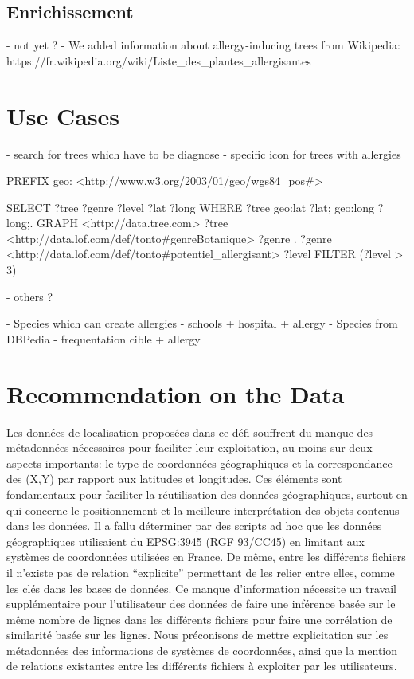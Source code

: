 \documentclass[a4paper,pagenum,english]{rnti}
\begin{document}
{\subsection{Enrichissement}
	- not yet ?
	- We added information about allergy-inducing trees from Wikipedia: https://fr.wikipedia.org/wiki/Liste_des_plantes_allergisantes
	

\section{Use Cases}
- search for trees which have to be diagnose
- specific icon for trees with allergies

PREFIX geo: <http://www.w3.org/2003/01/geo/wgs84_pos#>

SELECT ?tree ?genre ?level ?lat ?long
WHERE {
  ?tree geo:lat ?lat;
        geo:long ?long;.
  GRAPH <http://data.tree.com> {
    ?tree <http://data.lof.com/def/tonto#genreBotanique> ?genre .
    ?genre <http://data.lof.com/def/tonto#potentiel_allergisant> ?level }
  FILTER (?level > 3)
}

- others ?

- Species which can create allergies
- schools + hospital + allergy
- Species from DBPedia
- frequentation cible + allergy

\section{Recommendation on the Data}
Les données de localisation proposées dans ce défi souffrent du manque des métadonnées nécessaires pour faciliter leur exploitation, au moins sur deux aspects importants: le type de coordonnées géographiques et la correspondance des (X,Y) par rapport aux latitudes et longitudes. Ces éléments sont fondamentaux pour faciliter la réutilisation des données géographiques, surtout en qui concerne le positionnement et la meilleure interprétation des objets contenus dans les données. Il a fallu déterminer par des scripts ad hoc que les données géographiques utilisaient du EPSG:3945 (RGF 93/CC45) en limitant aux systèmes de coordonnées utilisées en France. 
De même, entre les différents fichiers il n’existe pas de relation “explicite” permettant de les relier entre elles, comme les clés dans les bases de données. Ce manque d’information nécessite un travail supplémentaire pour l’utilisateur des données de faire une inférence basée sur le même nombre de lignes dans les différents fichiers pour faire une corrélation de similarité basée sur les lignes.
Nous préconisons de mettre explicitation sur les métadonnées des informations de systèmes de coordonnées, ainsi que la mention de relations existantes entre les différents fichiers à exploiter par les utilisateurs. 

}
\end{document}
